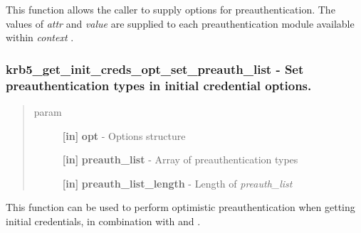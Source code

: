 \documentclass[letterpaper,10pt,english]{sphinxmanual}
\begin{document}
This function allows the caller to supply options for preauthentication. The values of \emph{attr} and \emph{value} are supplied to each preauthentication module available within \emph{context} .


\subsubsection{krb5\_get\_init\_creds\_opt\_set\_preauth\_list -  Set preauthentication types in initial credential options.}
\label{appdev/refs/api/krb5_get_init_creds_opt_set_preauth_list:krb5-get-init-creds-opt-set-preauth-list-set-preauthentication-types-in-initial-credential-options}\label{appdev/refs/api/krb5_get_init_creds_opt_set_preauth_list::doc}

\begin{fulllineitems}
\label{appdev/refs/api/krb5_get_init_creds_opt_set_preauth_list:c.krb5_get_init_creds_opt_set_preauth_list}
\end{fulllineitems}

\begin{quote}\begin{description}
\item[{param}] \leavevmode
\textbf{{[}in{]}} \textbf{opt} - Options structure

\textbf{{[}in{]}} \textbf{preauth\_list} - Array of preauthentication types

\textbf{{[}in{]}} \textbf{preauth\_list\_length} - Length of \emph{preauth\_list}

\end{description}\end{quote}

This function can be used to perform optimistic preauthentication when getting initial credentials, in combination with {\hyperref[appdev/refs/api/krb5_get_init_creds_opt_set_salt:c.krb5_get_init_creds_opt_set_salt]{}} and {\hyperref[appdev/refs/api/krb5_get_init_creds_opt_set_pa:c.krb5_get_init_creds_opt_set_pa]{}} .
\end{document}
